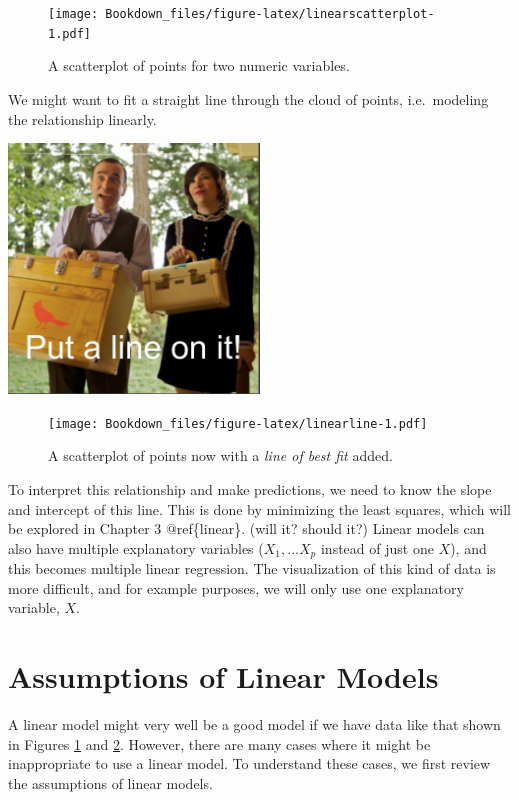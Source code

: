 \documentclass[
]{book}
\begin{document}
\begin{figure}
\centering
\texttt{[image: Bookdown\_files/figure-latex/linearscatterplot-1.pdf]}
\caption{\label{fig:linearscatterplot}A scatterplot of points for two numeric variables.}
\end{figure}

We might want to fit a straight line through the cloud of points, i.e.~modeling the relationship linearly.

\includegraphics[width=0.5\textwidth,height=\textheight]{images/put_a_bird.png}

\begin{figure}
\centering
\texttt{[image: Bookdown\_files/figure-latex/linearline-1.pdf]}
\caption{\label{fig:linearline}A scatterplot of points now with a \emph{line of best fit} added.}
\end{figure}

To interpret this relationship and make predictions, we need to know the slope and intercept of this line. This is done by minimizing the least squares, which will be explored in Chapter 3 @ref\{linear\}. (will it? should it?)
Linear models can also have multiple explanatory variables (\(X_1, \ldots X_p\) instead of just one \(X\)), and this becomes multiple linear regression. The visualization of this kind of data is more difficult, and for example purposes, we will only use one explanatory variable, \(X\).

\hypertarget{linear-assumptions}{%
\section{Assumptions of Linear Models}\label{linear-assumptions}}

A linear model might very well be a good model if we have data like that shown in Figures \ref{fig:linearscatterplot} and \ref{fig:linearline}. However, there are many cases where it might be inappropriate to use a linear model. To understand these cases, we first review the assumptions of linear models.
\end{document}
